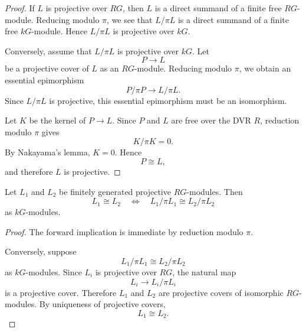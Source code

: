 \begin{proof}
    If \(L\) is projective over \(RG\), then \(L\) is a direct summand of a finite free
    \(RG\)-module. Reducing modulo \(\pi\), we see that \(L/\pi L\) is a direct
    summand of a finite free \(kG\)-module. Hence \(L/\pi L\) is projective over
    \(kG\).

    Conversely, assume that \(L/\pi L\) is projective over \(kG\). Let
    \[
        P\longrightarrow L
    \]
    be a projective cover of \(L\) as an \(RG\)-module. Reducing modulo \(\pi\), we
    obtain an essential epimorphism
    \[
        P/\pi P\longrightarrow L/\pi L.
    \]
    Since \(L/\pi L\) is projective, this essential epimorphism must be an isomorphism.

    Let \(K\) be the kernel of \(P\to L\). Since \(P\) and \(L\) are free over the DVR
    \(R\), reduction modulo \(\pi\) gives
    \[
        K/\pi K=0.
    \]
    By Nakayama's lemma, \(K=0\). Hence
    \[
        P\cong L,
    \]
    and therefore \(L\) is projective.
\end{proof}

\begin{corollary}
    Let \(L_1\) and \(L_2\) be finitely generated projective \(RG\)-modules. Then
    \[
        L_1\cong L_2
        \quad\Longleftrightarrow\quad
        L_1/\pi L_1\cong L_2/\pi L_2
    \]
    as \(kG\)-modules.
\end{corollary}

\begin{proof}
    The forward implication is immediate by reduction modulo \(\pi\).

    Conversely, suppose
    \[
        L_1/\pi L_1\cong L_2/\pi L_2
    \]
    as \(kG\)-modules. Since \(L_i\) is projective over \(RG\), the natural map
    \[
        L_i\longrightarrow L_i/\pi L_i
    \]
    is a projective cover. Therefore \(L_1\) and \(L_2\) are projective covers of
    isomorphic \(RG\)-modules. By uniqueness of projective covers,
    \[
        L_1\cong L_2.
    \]
\end{proof}

